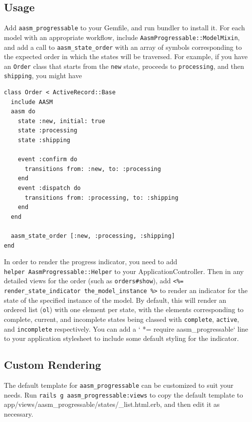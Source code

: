 \documentclass[document.tex]{subfiles}
\begin{document}
\subsection{Usage}

Add {\tt aasm\_progressable} to your Gemfile, and run bundler to install it. For each model with an appropriate workflow, include {\tt AasmProgressable::ModelMixin}, and add a call to {\tt aasm\_state\_order} with an array of symbols corresponding to
the expected order in which the states will be traversed. For example, if you have an {\tt Order} class that starts from the {\tt new} state, proceeds to {\tt processing}, and then {\tt shipping}, you might have

\pagebreak

\begin{lstlisting}
class Order < ActiveRecord::Base
  include AASM
  aasm do
    state :new, initial: true
    state :processing
    state :shipping
    
    event :confirm do
      transitions from: :new, to: :processing
    end
    event :dispatch do
      transitions from: :processing, to: :shipping
    end
  end
  
  aasm_state_order [:new, :processing, :shipping]
end

\end{lstlisting}   %

In order to render the progress indicator, you need to add \\ {\tt helper AasmProgressable::Helper} to your ApplicationController. Then in any detailed views for the order (such as {\tt orders\#show}), add {\tt \textless{}\%= render\_state\_indicator the\_model\_instance \%\textgreater{}} to render an indicator for the state of the specified instance of the model. By default, this will render an ordered list ({\tt ol}) with one element per state, with the elements corresponding to complete, current, and incomplete states being classed with {\tt complete}, {\tt active}, and {\tt incomplete} respectively. You can add a ` *= require aasm\_progressable` line to your application stylesheet to include some default styling for the indicator.

\subsection{Custom Rendering}

The default template for {\tt aasm\_progressable} can be customized to suit your needs. Run {\tt rails g aasm\_progressable:views} to copy the default template to \\ app/views/aasm\_progressable/states/\_list.html.erb, and then edit it as necessary.
\end{document}
